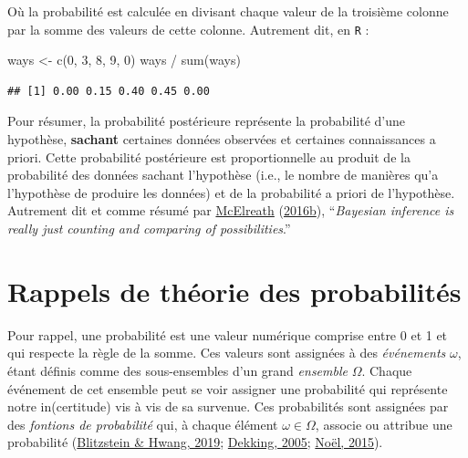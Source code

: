 \documentclass[
  a4paper,11pt,twoside,onecolumn,openright,final,oldfontcommands]{memoir}
\newenvironment{Shaded}{\begin{snugshade}}{\end{snugshade}}
\newcommand{\DecValTok}[1]{\textcolor[rgb]{0.00,0.00,0.81}{#1}}
\newcommand{\FunctionTok}[1]{\textcolor[rgb]{0.00,0.00,0.00}{#1}}
\newcommand{\NormalTok}[1]{#1}
\newcommand{\OtherTok}[1]{\textcolor[rgb]{0.56,0.35,0.01}{#1}}
\newcommand{\SpecialCharTok}[1]{\textcolor[rgb]{0.00,0.00,0.00}{#1}}
\theoremstyle{definition}
\theoremstyle{definition}
\theoremstyle{definition}
\theoremstyle{remark}
\begin{document}
Où la probabilité est calculée en divisant chaque valeur de la troisième colonne par la somme des valeurs de cette colonne. Autrement dit, en \texttt{R} :

\begin{Shaded}
\begin{Highlighting}[]
\NormalTok{ways }\OtherTok{\textless{}{-}} \FunctionTok{c}\NormalTok{(}\DecValTok{0}\NormalTok{, }\DecValTok{3}\NormalTok{, }\DecValTok{8}\NormalTok{, }\DecValTok{9}\NormalTok{, }\DecValTok{0}\NormalTok{)}
\NormalTok{ways }\SpecialCharTok{/} \FunctionTok{sum}\NormalTok{(ways)}
\end{Highlighting}
\end{Shaded}

\begin{verbatim}
## [1] 0.00 0.15 0.40 0.45 0.00
\end{verbatim}

Pour résumer, la probabilité postérieure représente la probabilité d'une hypothèse, \textbf{sachant} certaines données observées et certaines connaissances a priori. Cette probabilité postérieure est proportionnelle au produit de la probabilité des données sachant l'hypothèse (i.e., le nombre de manières qu'a l'hypothèse de produire les données) et de la probabilité a priori de l'hypothèse. Autrement dit et comme résumé par \protect\hyperlink{ref-mcelreath_statistical_2016}{McElreath} (\protect\hyperlink{ref-mcelreath_statistical_2016}{2016b}), ``\emph{Bayesian inference is really just counting and comparing of possibilities}.''

\hypertarget{rappels-de-thuxe9orie-des-probabilituxe9s}{%
\section{Rappels de théorie des probabilités}\label{rappels-de-thuxe9orie-des-probabilituxe9s}}

Pour rappel, une probabilité est une valeur numérique comprise entre 0 et 1 et qui respecte la règle de la somme. Ces valeurs sont assignées à des \emph{événements} \(\omega\), étant définis comme des sous-ensembles d'un grand \emph{ensemble} \(\Omega\). Chaque événement de cet ensemble peut se voir assigner une probabilité qui représente notre in(certitude) vis à vis de sa survenue. Ces probabilités sont assignées par des \emph{fontions de probabilité} qui, à chaque élément \(\omega \in \Omega\), associe ou attribue une probabilité (\protect\hyperlink{ref-blitzstein_introduction_2019}{Blitzstein \& Hwang, 2019}; \protect\hyperlink{ref-dekking_modern_2005}{Dekking, 2005}; \protect\hyperlink{ref-noel_psychologie_2015}{Noël, 2015}).
\end{document}
